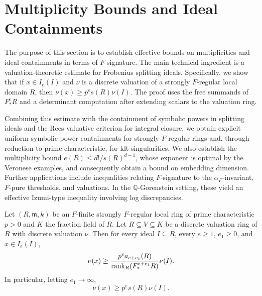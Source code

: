 \documentclass[12pt]{amsart}
\numberwithin{equation}{theorem}
\theoremstyle{plain}
\newcommand{\fm}{\mathfrak{m}}
\newcommand{\QQ}{\mathbb{Q}}
\begin{document}
\section{Multiplicity Bounds and Ideal Containments}\label{section: effective bounds}

The purpose of this section is to establish effective bounds on multiplicities and ideal containments in terms of $F$-signature. The main technical ingredient is a valuation-theoretic estimate for Frobenius splitting ideals. Specifically, we show that if $x\in I_e(I)$ and $\nu$ is a discrete valuation of a strongly $F$-regular local domain $R$, then $\nu(x)\geq p^es(R)\nu(I)$. The proof uses the free summands of $F^e_*R$ and a determinant computation after extending scalars to the valuation ring.

Combining this estimate with the containment of symbolic powers in splitting ideals and the Rees valuative criterion for integral closure, we obtain explicit uniform symbolic power containments for strongly $F$-regular rings and, through reduction to prime characteristic, for klt singularities. We also establish the multiplicity bound $e(R)\leq d!/s(R)^{d-1}$, whose exponent is optimal by the Veronese examples, and consequently obtain a bound on embedding dimension. Further applications include inequalities relating $F$-signature to the $\alpha_F$-invariant, $F$-pure thresholds, and valuations. In the $\QQ$-Gorenstein setting, these yield an effective Izumi-type inequality involving log discrepancies.


\begin{theorem}
    \label{thm: splitting ideals and valuation rings}
    Let $(R,\fm,k)$ be an $F$-finite strongly $F$-regular local ring of prime characteristic $p>0$ and $K$ the fraction field of $R$. Let $R\subseteq V\subseteq K$ be a discrete valuation ring of $R$ with discrete valuation $\nu$. Then for every ideal $I\subseteq R$, every $e\geq 1$, $e_1\geq 0$, and $x\in I_e(I)$,
    \[
    \nu(x)\geq \frac{p^ea_{e+e_1}(R)}{\operatorname{{rank}}_R(F^{e+e_1}_*R)}\nu(I).
    \]
    In particular, letting $e_1\to \infty$,
    \[
    \nu(x)\geq p^es(R)\nu(I).
    \]
\end{theorem}
\end{document}
